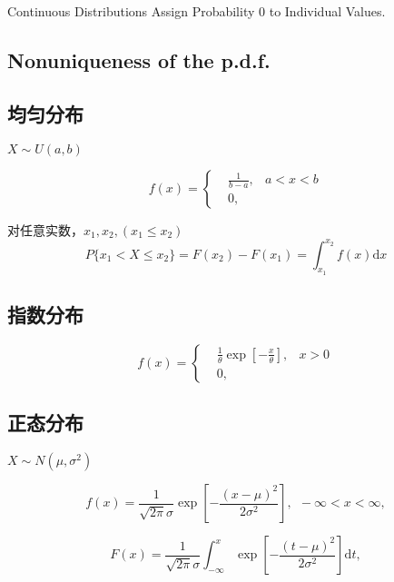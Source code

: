 \documentclass[12pt,a4paper]{article}
\newcommand{\dif}{\mathrm{d}}
\begin{document}
Continuous Distributions Assign Probability $0$ to Individual Values.

\subsection{Nonuniqueness of the p.d.f.}

\subsection{均匀分布}
$X\sim U(a, b)$

\begin{equation}
f(x) = \left\{
\begin{aligned}
&\frac{1}{b-a},& a < x < b\\
&0,&  
\end{aligned}
\right.
\end{equation}

对任意实数，$x_1, x_2, (x_1 \leq x_2)$
\begin{equation}
P\{x_1 < X \leq x_2 \} = F(x_2) - F(x_1) = \int_{x_1}^{x_2} f(x) \dif x
\end{equation}



\subsection{指数分布}
\begin{equation}
f(x) = \left\{
\begin{aligned}
&\frac{1}{\theta} \exp \left[-\frac{x}{\theta} \right],& x > 0 \\
&0,& 
\end{aligned}
\right.
\end{equation}


\subsection{正态分布}

$X\sim N(\mu, \sigma^2)$

\begin{equation}
f(x) = \frac{1}{\sqrt{2\pi} \sigma} \exp \left[-\frac{(x-\mu)^2}{2\sigma^2} \right], ~~ -\infty < x < \infty,
\end{equation}

\begin{equation}
F(x) = \frac{1}{\sqrt{2\pi} \sigma} \int_{-\infty}^{x} \exp \left[-\frac{(t-\mu)^2}{2\sigma^2} \right] \dif t,
\end{equation}
\end{document}
